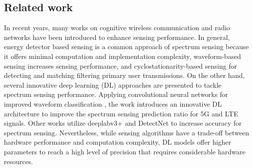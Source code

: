 \documentclass[journal]{IEEEtran} %
\begin{document}
\subsection{Related work}
In recent years, many works on cognitive wireless communication and radio networks have been introduced to enhance sensing performance. In general, energy detector based sensing is a common approach of spectrum sensing because it offers minimal computation and implementation complexity, waveform-based sensing increases sensing performance, and cyclostationarity-based sensing for detecting and matching filtering primary user transmissions. On the other hand, several innovative deep learning (DL) approaches are presented to tackle spectrum sensing performance. Applying convolutional neural networks for improved waveform classification \cite{huynh2024improved}, the work \cite{huynhthe2023intelligence} introduces an innovative DL architecture to improve the spectrum sensing prediction ratio for 5G and LTE signals. Other works utilize deeplabv3+ \cite{nguyen2023accurate} and DetectNet \cite{gao2019deep} to increase accuracy for spectrum sensing. Nevertheless, while sensing algorithms have a trade-off between hardware performance and computation complexity, DL models offer higher parameters to reach a high level of precision that requires considerable hardware resources.
\end{document}
